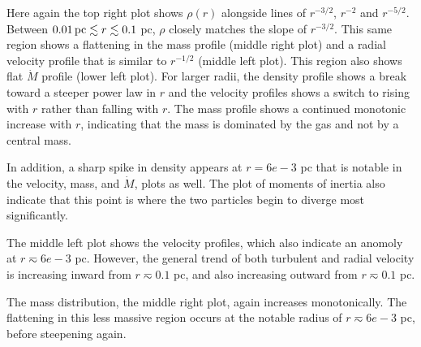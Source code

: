 \documentclass{emulateapj}
\begin{document}
Here again the top right plot shows $\rho(r)$ alongside lines of $r^{-3/2}$, $r^{-2}$ and $r^{-5/2}$.  Between $0.01\,{\rm pc} \lesssim r \lesssim 0.1$ pc, $\rho$ closely matches the slope of $r^{-3/2}$.  This same region shows a flattening in the mass profile (middle right plot) and a radial velocity profile that is similar to $r^{-1/2}$ (middle left plot).  This region also shows flat $\dot{M}$ profile (lower left plot).  For larger radii, the density profile shows a break toward a steeper power law in $r$ and the velocity profiles shows a switch to rising with $r$ rather than falling with $r$.  The mass profile shows a continued monotonic increase with $r$, indicating that the mass is dominated by the gas and not by a central mass.  

In addition, a sharp spike in density appears at $r = 6e-3$ pc that is notable in the velocity, mass, and $\dot M$, plots as well.  The plot of moments of inertia also indicate that this point is where the two particles begin to diverge most significantly. 

The middle left plot shows the velocity profiles, which also indicate an anomoly at $r \eqsim 6e-3$ pc.  However, the general trend of both turbulent and radial velocity is increasing inward from $r \eqsim 0.1$ pc, and also increasing outward from $r \eqsim 0.1$ pc.

The mass distribution, the middle right plot, again increases monotonically.  The flattening in this less massive region occurs at the notable radius of $r \eqsim 6e-3$ pc, before steepening again.           


\end{document}
